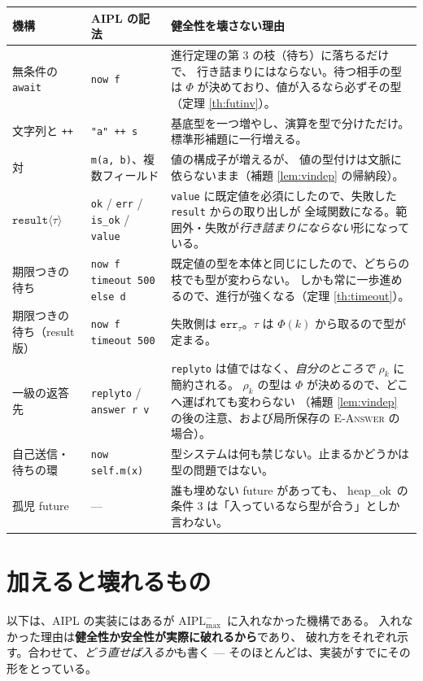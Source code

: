 \documentclass[11pt,a4paper]{ltjsarticle}
\theoremstyle{definition}
\theoremstyle{remark}
\newcommand{\tres}[1]{\ensuremath{\mathtt{result}\langle #1 \rangle}}
\newcommand{\Ph}{\Phi}
\newcommand{\heapok}{\textsf{heap\_ok}}
\newcommand{\Amax}{\ensuremath{\mathrm{AIPL}^{-}_{\max}}}
\begin{document}
\begin{longtable}{p{}p{}p{}}
\toprule
機構 & AIPL の記法 & 健全性を壊さない理由 \\
\midrule
\endhead
無条件の \texttt{await} & \texttt{now f} & 進行定理の第 3 の枝（待ち）に落ちるだけで、
  行き詰まりにはならない。待つ相手の型は $\Ph$ が決めており、値が入るなら必ずその型
  （定理 \ref{th:futinv}）。 \\
文字列と \texttt{++} & \texttt{"a" ++ s} & 基底型を一つ増やし、演算を型で分けただけ。
  標準形補題に一行増える。 \\
対 & \texttt{m(a, b)}、複数フィールド & 値の構成子が増えるが、
  値の型付けは文脈に依らないまま（補題 \ref{lem:vindep} の帰納段）。 \\
\tres{\tau} & \texttt{ok} / \texttt{err} / \texttt{is\_ok} / \texttt{value} &
  \texttt{value} に既定値を必須にしたので、失敗した \texttt{result} からの取り出しが
  全域関数になる。範囲外・失敗が\emph{行き詰まりにならない}形になっている。 \\
期限つきの待ち & \texttt{now f timeout 500 else d} &
  既定値の型を本体と同じにしたので、どちらの枝でも型が変わらない。
  しかも常に一歩進めるので、進行が強くなる（定理 \ref{th:timeout}）。 \\
期限つきの待ち（result 版） & \texttt{now f timeout 500} &
  失敗側は $\mathtt{err}_\tau$。$\tau$ は $\Ph(k)$ から取るので型が定まる。 \\
一級の返答先 & \texttt{replyto} / \texttt{answer r v} &
  \texttt{replyto} は値ではなく、\emph{自分のところで} $\rho_k$ に簡約される。
  $\rho_k$ の型は $\Ph$ が決めるので、どこへ運ばれても変わらない
  （補題 \ref{lem:vindep} の後の注意、および局所保存の \textsc{E-Answer} の場合）。 \\
自己送信・待ちの環 & \texttt{now self.m(x)} &
  型システムは何も禁じない。止まるかどうかは型の問題ではない。 \\
孤児 future & --- & 誰も埋めない future があっても、
  \heapok\ の条件 3 は「入っているなら型が合う」としか言わない。 \\
\bottomrule
\end{longtable}

\section{加えると壊れるもの}\label{sec:out}

以下は、AIPL の実装にはあるが \Amax\ に入れなかった機構である。
入れなかった理由は\textbf{健全性か安全性が実際に破れるから}であり、
破れ方をそれぞれ示す。合わせて、\emph{どう直せば入るか}も書く ---
そのほとんどは、実装がすでにその形をとっている。
\end{document}
